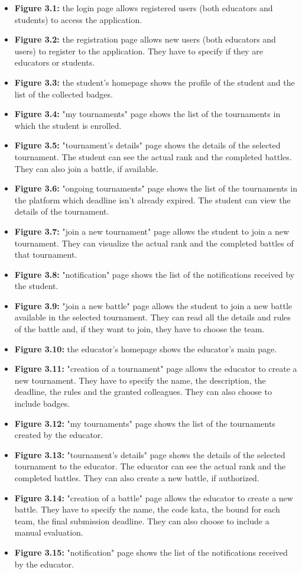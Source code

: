 \begin{itemize}
    \item \textbf{Figure 3.1:} the login page allows registered users (both educators and students) to access the application.
    \item \textbf{Figure 3.2:} the registration page allows new users (both educators and users) to register to the application. They have to specify if they are educators or students.
    \item \textbf{Figure 3.3:} the student's homepage shows the profile of the student and the list of the collected badges.
    \item \textbf{Figure 3.4:} "my tournaments" page shows the list of the tournaments in which the student is enrolled.
    \item \textbf{Figure 3.5:} "tournament's details" page shows the details of the selected tournament. The student can see the actual rank and the completed battles. They can also join a battle, if available.
    \item \textbf{Figure 3.6:} "ongoing tournaments" page shows the list of the tournaments in the platform which deadline isn't already expired. The student can view the details of the tournament.
    \item \textbf{Figure 3.7:} "join a new tournament" page allows the student to join a new tournament. They can visualize the actual rank and the completed battles of that tournament. 
    \item \textbf{Figure 3.8:} "notification" page shows the list of the notifications received by the student. 
    \item \textbf{Figure 3.9:} "join a new battle" page allows the student to join a new battle available in the selected tournament. They can read all the details and rules of the battle and, if they want to join, they have to choose the team.
    \item \textbf{Figure 3.10:} the educator's homepage shows the educator's main page.
    \item \textbf{Figure 3.11:} "creation of a tournament" page allows the educator to create a new tournament. They have to specify the name, the description, the deadline, the rules and the granted colleagues. They can also choose to include badges.
    \item \textbf{Figure 3.12:} "my tournaments" page shows the list of the tournaments created by the educator.
    \item \textbf{Figure 3.13:} "tournament's details" page shows the details of the selected tournament to the educator. The educator can see the actual rank and the completed battles. They can also create a new battle, if authorized.
    \item \textbf{Figure 3.14:} "creation of a battle" page allows the educator to create a new battle. They have to specify the name, the code kata, the bound for each team, the final submission deadline. They can also choose to include a manual evaluation.
    \item \textbf{Figure 3.15:} "notification" page shows the list of the notifications received by the educator.
\end{itemize}

